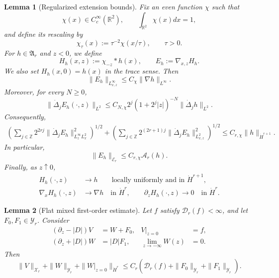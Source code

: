 \documentclass[10pt,a4paper]{amsart}
\newtheorem{lemma}{Lemma}
\newcommand{\R}{\mathbb{R}}
\begin{document}
\begin{lemma}[Regularized extension bounds]
\label{lem:regularized-extension-two-level}
Fix an even function \(\chi\) such that
\[
 \chi(x)\in C^\infty_c(\R^2), \qquad \int_{\R^2}\chi(x) dx =1,
\]
and define its rescaling by
\[
 \chi_\tau(x):=\tau^{-2}\chi(x/\tau), \qquad \tau>0.
\]
For \(h\in\mathfrak A_r\) and \(z<0\), we define
\[
 H_h(x,z):=\chi_{-z}*h(x), \qquad E_h:=\nabla_{x,z}H_h.
\]
We also set \(H_h(x,0)=h(x)\) in the trace sense.
Then
\begin{equation}
\label{eq:Eh-Linfty}
 \|E_h\|_{L^\infty_{x,z}} \leq C_\chi\|\nabla h\|_{L^\infty}.
\end{equation}
Moreover, for every \(N\geq0\),
\begin{equation*}
 \|\dot\Delta_jE_h(\cdot,z)\|_{L^2} \leq C_{N,\chi} 2^j(1+2^j|z|)^{-N} \|\dot\Delta_jh\|_{L^2}.
\end{equation*}
Consequently,
\begin{align}
\label{eq:Eh-high}
 \left( \sum_{j\in\mathbb Z} 2^{2rj} \|\dot\Delta_jE_h\|_{L^\infty_zL^2_x}^2 \right)^{1/2}+ \left( \sum_{j\in\mathbb Z} 2^{(2r+1)j} \|\dot\Delta_jE_h\|_{L^2_{x,z}}^2 \right)^{1/2} \leq C_{r,\chi}\|h\|_{\dot H^{r+1}}.
\end{align}
In particular,
\begin{equation*}
 \|E_h\|_{\mathcal E_r} \leq C_{r,\chi}\mathcal A_r(h).
\end{equation*}
Finally, as \(z\uparrow0\),
\begin{equation}
\label{eq:regularized-extension-boundary-traces}
\begin{aligned}
 H_h(\cdot,z)&\longrightarrow h \qquad \text{locally uniformly and in }\dot H^{r+1},\\
 \nabla_xH_h(\cdot,z)&\longrightarrow\nabla h \quad\text{in }\dot H^r,
 \qquad \partial_zH_h(\cdot,z)\longrightarrow0 \quad\text{in }\dot H^r.
\end{aligned}
\end{equation}
\end{lemma}

\begin{lemma}[Flat mixed first-order estimate]
\label{lem:flat-mixed-elliptic}
Let \(f\) satisfy \(\mathcal D_r(f)<\infty\), and let \(F_0,F_1\in\mathcal Y_r\).
Consider
\begin{align*}
 (\partial_z-|D|)V&=W+F_0, &V|_{z=0}&=f,\\
 (\partial_z+|D|)W&=|D|F_1, &\lim_{z\to-\infty}W(z)&=0.
\end{align*}
Then
\begin{equation*}
 \|V\|_{\mathcal X_r} + \|W\|_{\mathcal Y_r} + \|W|_{z=0}\|_{\dot H^r} \leq C_r \left( \mathcal D_r(f) + \|F_0\|_{\mathcal Y_r} + \|F_1\|_{\mathcal Y_r} \right).
\end{equation*}
\end{lemma}
\end{document}
